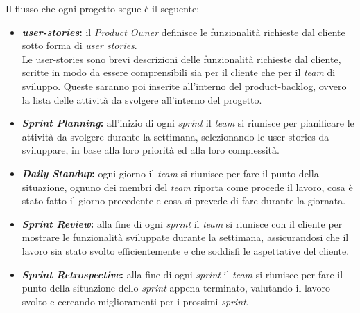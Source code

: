 Il flusso che ogni progetto segue è il seguente:
\begin{itemize}
    \item \textbf{\textit{\gls{user-stories}}:} il \textit{Product Owner} definisce le funzionalità richieste dal cliente sotto forma di \textit{user stories}.\\
    Le \gls{user-stories} sono brevi descrizioni delle funzionalità richieste dal cliente, scritte in modo da essere comprensibili sia per il cliente che per il \textit{team} di sviluppo.
    Queste saranno poi inserite all'interno del \gls{product-backlog}, ovvero la lista delle attività da svolgere all'interno del progetto.
    \item \textbf{\textit{Sprint Planning}:} all'inizio di ogni \textit{sprint} il \textit{team} si riunisce per pianificare le attività da svolgere durante la settimana, selezionando le \gls{user-stories} da sviluppare, 
    in base alla loro priorità ed alla loro complessità.
    \item \textbf{\textit{Daily Standup}:} ogni giorno il \textit{team} si riunisce per fare il punto della situazione, ognuno dei membri del \textit{team} riporta come procede il lavoro,
    cosa è stato fatto il giorno precedente e cosa si prevede di fare durante la giornata.
    \item \textbf{\textit{Sprint Review}:} alla fine di ogni \textit{sprint} il \textit{team} si riunisce con il cliente per mostrare le funzionalità sviluppate durante la settimana, assicurandosi che il lavoro sia stato svolto efficientemente e 
    che soddisfi le aspettative del cliente.
    \item \textbf{\textit{Sprint Retrospective}:} alla fine di ogni \textit{sprint} il \textit{team} si riunisce per fare il punto della situazione dello \textit{sprint} appena terminato, 
    valutando il lavoro svolto e cercando miglioramenti per i prossimi \textit{sprint}.
\end{itemize}